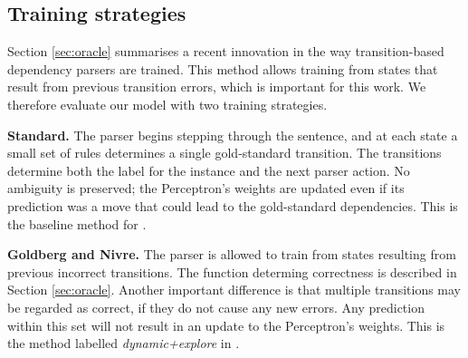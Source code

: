 \documentclass[11pt,letterpaper]{article}
\begin{document}
\subsection{Training strategies}

Section \ref{sec:oracle} summarises a recent innovation in the way transition-based
dependency parsers are trained. This method allows training from states that
result from previous transition errors, which is
important for this work. We therefore evaluate our model with two training strategies.

\textbf{Standard.} 
The parser begins stepping through the sentence, and at each state a small
set of rules determines a single gold-standard transition. The transitions
determine both the label for the instance and the next parser action. No ambiguity
is preserved; the Perceptron's weights are updated even if its prediction was a move
that could lead to the gold-standard dependencies.
This is the baseline method for \citet{goldberg:12}.

\textbf{Goldberg and Nivre.} The parser is allowed to train from states
resulting from previous incorrect transitions. The function determing correctness
is described in Section \ref{sec:oracle}. Another important difference is that
multiple transitions may be regarded as correct, if they do not cause any new
errors. Any prediction within this set will not result in an update to the
Perceptron's weights. This is the method labelled \emph{dynamic+explore}
in \citet{goldberg:12}.
\end{document}
